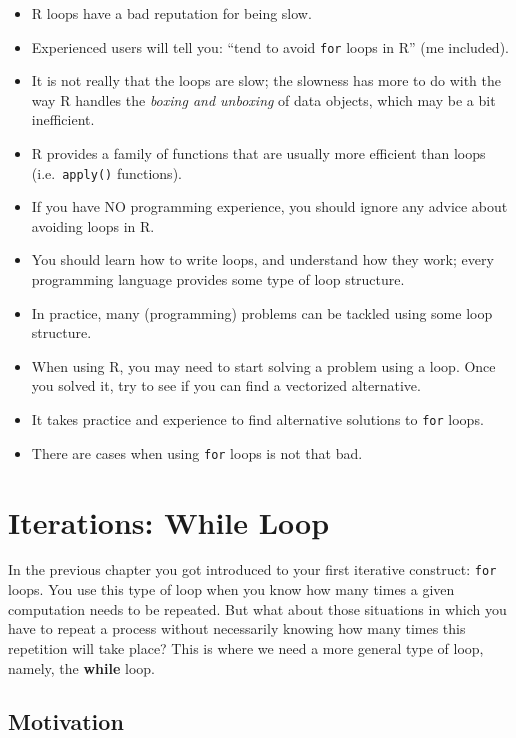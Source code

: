 \documentclass[
]{book}
\begin{document}
\begin{itemize}
\item
  R loops have a bad reputation for being slow.
\item
  Experienced users will tell you: ``tend to avoid \texttt{for} loops in R'' (me included).
\item
  It is not really that the loops are slow; the slowness has more to do with
  the way R handles the \emph{boxing and unboxing} of data objects, which may be a bit
  inefficient.
\item
  R provides a family of functions that are usually more efficient than loops
  (i.e.~\texttt{apply()} functions).
\item
  If you have NO programming experience, you should ignore any advice about
  avoiding loops in R.
\item
  You should learn how to write loops, and understand how they work; every
  programming language provides some type of loop structure.
\item
  In practice, many (programming) problems can be tackled using some loop structure.
\item
  When using R, you may need to start solving a problem using a loop. Once you
  solved it, try to see if you can find a vectorized alternative.
\item
  It takes practice and experience to find alternative solutions to \texttt{for} loops.
\item
  There are cases when using \texttt{for} loops is not that bad.
\end{itemize}

\hypertarget{while-loop}{%
\chapter{Iterations: While Loop}\label{while-loop}}

In the previous chapter you got introduced to your first iterative construct:
\texttt{for} loops. You use this type of loop when you know how many times a
given computation needs to be repeated. But what about those situations in
which you have to repeat a process without necessarily knowing how many times
this repetition will take place? This is where we need a more general type of
loop, namely, the \textbf{while} loop.

\hypertarget{motivation-6}{%
\section{Motivation}\label{motivation-6}}
\end{document}
